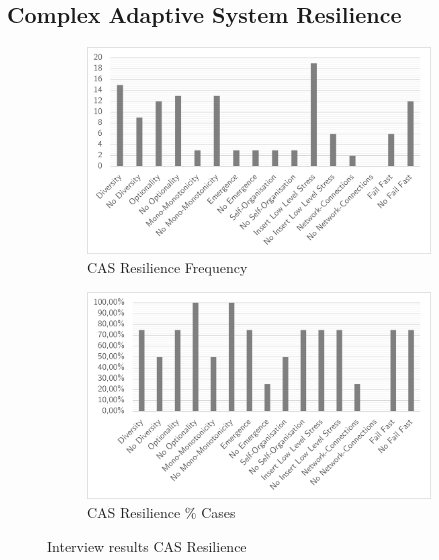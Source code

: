 \subsection{Complex Adaptive System Resilience}
\begin{figure}[H]
	\centering
	\begin{subfigure}[H]{0.5\textwidth}
		\centering
		\includegraphics[width=0.95\linewidth]{images/cas_frequency}
		\caption{CAS Resilience Frequency}
		\label{fig:casfrequency}
	\end{subfigure}%
	\begin{subfigure}[H]{0.5\textwidth}
		\centering
		\includegraphics[width=0.95\linewidth]{images/cas_cases}
		\caption{CAS Resilience \% Cases}
		\label{fig:cascases}
	\end{subfigure}
	\caption{Interview results CAS Resilience}
	\label{fig:interviewresultscas}
\end{figure}
